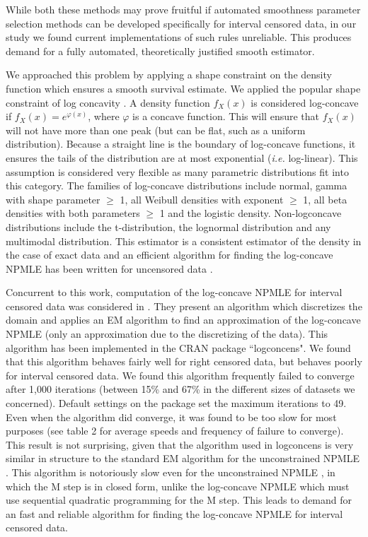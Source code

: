 	 While both these methods may prove fruitful if automated smoothness parameter selection methods can be developed specifically for interval censored data, in our study we found current implementations of such rules unreliable. This produces demand for a fully automated, theoretically justified smooth estimator. 
		
	We approached this problem by applying a shape constraint on the density function which ensures a smooth survival estimate. We applied the popular shape constraint of log concavity \cite{RefBB2005}. A density function $f_X(x)$ is considered log-concave if $f_X(x) = e^{\varphi(x)}$, where $\varphi$ is a concave function. This will ensure that $f_X(x)$ will not have more than one peak (but can be flat, such as a uniform distribution). Because a straight line is the boundary of log-concave functions, it ensures the tails of the distribution are at most exponential (\emph{i.e.} log-linear). This assumption is considered very flexible as many parametric distributions fit into this category. The families of log-concave distributions include normal, gamma with shape parameter $\ge$ 1, all Weibull densities with exponent $\ge$ 1, all beta densities with both parameters $\ge$ 1 and the logistic density. Non-logconcave distributions include the t-distribution, the lognormal distribution and any multimodal distribution. This estimator is a consistent estimator of the density in the case of exact data \cite{RefDR2009} and an efficient algorithm for finding the log-concave NPMLE has been written for uncensored data \cite{RefDea2011}. 

	Concurrent to this work, computation of the log-concave NPMLE for interval censored data was considered in \cite{RefDea2011}. They present an algorithm which discretizes the domain and  applies an EM algorithm to find an approximation of the log-concave NPMLE (only an approximation due to the discretizing of the data). This algorithm has been implemented in the CRAN package ``logconcens". We found that this algorithm behaves fairly well for right censored data, but behaves poorly for interval censored data. We found this algorithm frequently failed to converge after 1,000 iterations (between 15\% and 67\% in the different sizes of datasets we concerned). Default settings on the package set the maximum iterations to 49. Even when the algorithm did converge, it was found to be too slow for most purposes (see table 2 for average speeds and frequency of failure to converge). This result is not surprising, given that the algorithm used in logconcens is very similar in structure to the standard EM algorithm for the unconstrained NPMLE \cite{RefT1976}. This algorithm is notoriously slow even for the unconstrained NPMLE \cite{RefJ1998}, in which the M step is in closed form, unlike the log-concave NPMLE which must use sequential quadratic programming for the M step. This leads to demand for an fast and reliable algorithm for finding the log-concave NPMLE for interval censored data. 
		
